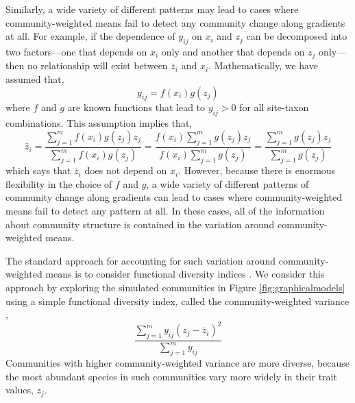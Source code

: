 \documentclass[12pt]{ecology}
\begin{document}
Similarly, a wide variety of different patterns may lead to cases where community-weighted means fail to detect any community change along gradients at all.  For example, if the dependence of $y_{ij}$ on $x_i$ and $z_j$ can be decomposed into two factors---one that depends on $x_i$ only and another that depends on $z_j$ only---then no relationship will exist between $\bar{z}_i$ and $x_i$.  Mathematically, we have assumed that,
\begin{equation}
y_{ij} = f(x_i) g(z_j)
\end{equation}
where $f$ and $g$ are known functions that lead to $y_{ij} > 0$ for all site-taxon combinations.  This assumption implies that,
\begin{equation}
\bar{z}_i = 
\frac{\sum_{j=1}^m f(x_i) g(z_j) z_j}{\sum_{j=1}^m f(x_i) g(z_j)} =  
\frac{f(x_i) \sum_{j=1}^m g(z_j) z_j}{f(x_i) \sum_{j=1}^m g(z_j)} = 
\frac{\sum_{j=1}^m g(z_j) z_j}{\sum_{j=1}^m g(z_j)}
\end{equation}
which says that $\bar{z}_i$ does not depend on $x_i$.  However, because there is enormous flexibility in the choice of $f$ and $g$, a wide variety of different patterns of community change along gradients can lead to cases where community-weighted means fail to detect any pattern at all.  In these cases, all of the information about community structure is contained in the variation around community-weighted means.



The standard approach for accounting for such variation around community-weighted means is to consider functional diversity indices \citetext{e.g. \citealp{DiazEtAl2007, SpasojevicAndSuding2011}}.  We consider this approach by exploring the simulated communities in Figure \ref{fig:graphicalmodels} using a simple functional diversity index, called the community-weighted variance \citep{SonnierEtAl2010},
\begin{equation} 
\frac{\sum_{j=1}^m y_{ij} (z_j - \bar{z}_i)^2}{\sum_{j=1}^m y_{ij}} %
\label{eq:cwvdef}
\end{equation}
Communities with higher community-weighted variance are more diverse, because the most abundant species in such communities vary more widely in their trait values, $z_j$.
\end{document}
